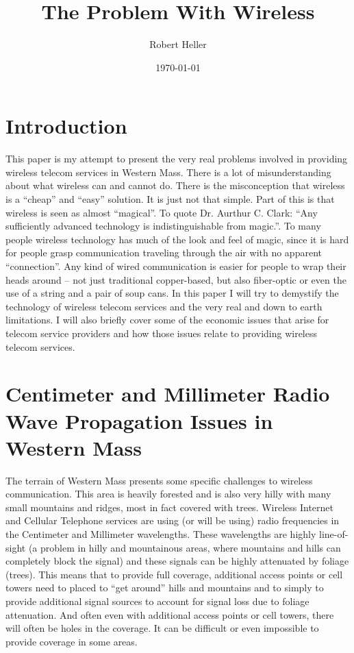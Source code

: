 \documentclass[12pt]{article}
\title{The Problem With Wireless}
\author{Robert Heller}
\date{\today}
\begin{document}
\maketitle

\tableofcontents


\section{Introduction}

This paper is my attempt to present the very real problems involved in 
providing wireless telecom services in Western Mass.  There is a lot of 
misunderstanding about what wireless can and cannot do.  There is the 
misconception that wireless is a ``cheap'' and ``easy'' solution.  It is just 
not that simple.  Part of this is that wireless is seen as almost ``magical''. 
To quote Dr. Aurthur C. Clark: ``Any sufficiently advanced technology is 
indistinguishable from magic.''.  To many people wireless technology has much of 
the look and feel of magic, since it is hard for people grasp communication 
traveling through the air with no apparent ``connection''.  Any kind of wired 
communication is easier for people to wrap their heads around -- not just 
traditional copper-based, but also fiber-optic or even the use of a string and 
a pair of soup cans.  In this paper I will try to demystify the technology of 
wireless telecom services and the very real and down to earth limitations.  I 
will also briefly cover some of the economic issues that arise for telecom 
service providers and how those issues relate to providing wireless telecom 
services.


\section{Centimeter and Millimeter Radio Wave Propagation Issues in Western Mass}

The terrain of Western Mass presents some specific challenges to wireless
communication. This area is heavily forested and is also very hilly with many
small mountains and ridges, most in fact covered with trees. Wireless Internet
and Cellular Telephone services are using (or will be using) radio frequencies
in the Centimeter and Millimeter wavelengths. These wavelengths are highly
line-of-sight (a problem in hilly and mountainous areas, where mountains and
hills can completely block the signal) and these signals can be highly
attenuated by foliage (trees)\cite{Effect.IJCA.0975-8887}. This means that to
provide full coverage, additional access points or cell towers need to placed
to ``get around'' hills and mountains and to simply to provide additional
signal sources to account for signal loss due to foliage attenuation. And
often even with additional access points or cell towers, there will often be
holes in the coverage. It can be difficult or even impossible to provide
coverage in some areas.
\end{document}
